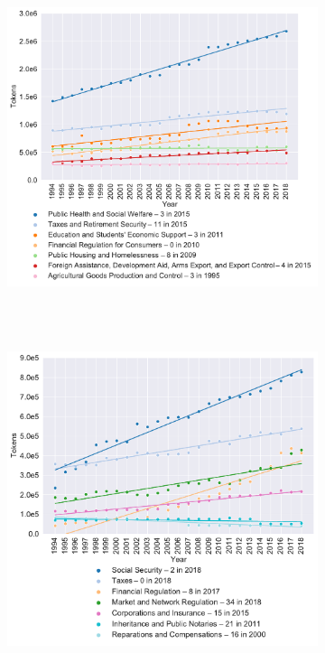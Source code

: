 \documentclass[varwidth, border=0pt]{standalone}
\begin{document}
	
	\begin{figure}
\centering
	\begin{subfigure}{0.5\linewidth}
	\includegraphics[width=\linewidth]{../../graphics/cluster-evolution-size-dynamics-us-0-0_1-0_-1_a-infomap_n100_m1-0_s0_c1000-selected.pdf}~%
\end{subfigure}~%
\begin{subfigure}{0.5\linewidth}
	\includegraphics[width=\linewidth]{../../graphics/cluster-evolution-size-dynamics-de-0-0_1-0_-1_a-infomap_n100_m1-0_s0_c1000-selected.pdf}~%
\end{subfigure}
	\end{figure}
	
\end{document}
